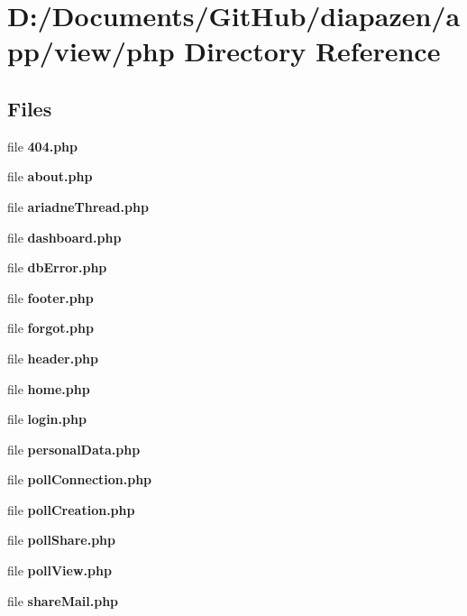 \section{D\-:/\-Documents/\-Git\-Hub/diapazen/app/view/php Directory Reference}
\label{dir_a10a34e384b7c248baecf7755987c7b5}
\subsection*{Files}
\begin{DoxyCompactItemize}
\item 
file {\bfseries 404.\-php}
\item 
file {\bfseries about.\-php}
\item 
file {\bfseries ariadne\-Thread.\-php}
\item 
file {\bfseries dashboard.\-php}
\item 
file {\bfseries db\-Error.\-php}
\item 
file {\bfseries footer.\-php}
\item 
file {\bfseries forgot.\-php}
\item 
file {\bfseries header.\-php}
\item 
file {\bfseries home.\-php}
\item 
file {\bfseries login.\-php}
\item 
file {\bfseries personal\-Data.\-php}
\item 
file {\bfseries poll\-Connection.\-php}
\item 
file {\bfseries poll\-Creation.\-php}
\item 
file {\bfseries poll\-Share.\-php}
\item 
file {\bfseries poll\-View.\-php}
\item 
file {\bfseries share\-Mail.\-php}
\end{DoxyCompactItemize}
